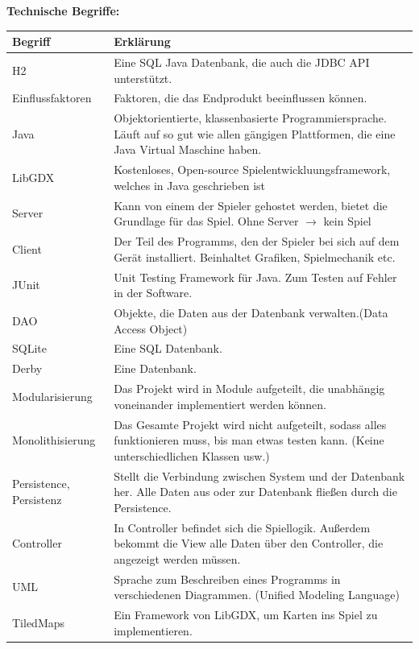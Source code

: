 \documentclass[fontsize=12pt,paper=a4,twoside]{scrartcl}
\begin{document}
\textbf{Technische Begriffe:}
\begin{center}
\begin{tabular}{|p{3cm}|p{12cm}|}
\hline
Begriff & Erklärung \\ \hline
H2 & Eine SQL Java Datenbank, die auch die JDBC API unterstützt. \\ \hline
Einflussfaktoren & Faktoren, die das Endprodukt beeinflussen können. \\ \hline
Java & Objektorientierte, klassenbasierte Programmiersprache. Läuft auf so gut wie allen gängigen Plattformen, die eine Java Virtual Maschine haben.\\ \hline  
LibGDX & Kostenloses, Open-source Spielentwickluungsframework, welches in Java geschrieben ist\\ \hline
Server & Kann von einem der Spieler gehostet werden, bietet die Grundlage für das Spiel. Ohne Server $\rightarrow$ kein Spiel \\ \hline
Client & Der Teil des Programms, den der Spieler bei sich auf dem Gerät installiert. Beinhaltet Grafiken, Spielmechanik etc. \\ \hline
JUnit & Unit Testing Framework für Java. Zum Testen auf Fehler in der Software.\\ \hline  
DAO & Objekte, die Daten aus der Datenbank verwalten.(Data Access Object)\\ \hline
SQLite & Eine SQL Datenbank. \\ \hline
Derby & Eine Datenbank.\\ \hline
Modularisierung & Das Projekt wird in Module aufgeteilt, die unabhängig voneinander implementiert werden können. \\ \hline  
Monolithisierung & Das Gesamte Projekt wird nicht aufgeteilt, sodass alles funktionieren muss, bis man etwas testen kann. (Keine unterschiedlichen Klassen usw.)\\ \hline
Persistence, Persistenz & Stellt die Verbindung zwischen System und der Datenbank her. Alle Daten aus oder zur Datenbank fließen durch die Persistence.\\ \hline
Controller & In Controller befindet sich die Spiellogik. Außerdem bekommt die View alle Daten über den Controller, die angezeigt werden müssen.\\ \hline
UML & Sprache zum Beschreiben eines Programms in verschiedenen Diagrammen. (Unified Modeling Language)\\ \hline  
TiledMaps & Ein Framework von LibGDX, um Karten ins Spiel zu implementieren. \\ \hline

 
\end{tabular}
\end{center}
\end{document}
